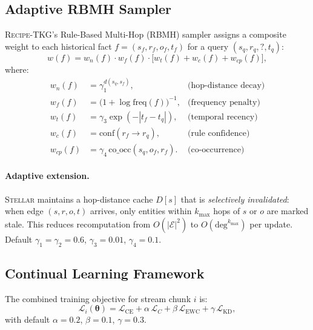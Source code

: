 \documentclass[10pt,twocolumn]{article}
\theoremstyle{definition}
\newcommand{\recipe}{\textsc{Recipe-TKG}}
\newcommand{\bftheta}{\bm{\theta}}
\newcommand{\calE}{\mathcal{E}}
\newcommand{\calL}{\mathcal{L}}
\begin{document}
\subsection{Adaptive RBMH Sampler}
\label{sec:sampler}

\recipe{}'s Rule-Based Multi-Hop (RBMH) sampler assigns a composite weight
to each historical fact $f = (s_f, r_f, o_f, t_f)$ for a query
$(s_q, r_q, ?, t_q)$:
\begin{equation}
  w(f) = w_n(f)\cdot w_f(f)\cdot\bigl[w_t(f) + w_c(f) + w_{cp}(f)\bigr],
  \label{eq:rbmh}
\end{equation}
where:
\begin{align}
  w_n(f) &= \gamma_1^{d(s_q, s_f)},
             &\text{(hop-distance decay)}\\
  w_f(f) &= \bigl(1 + \log \text{freq}(f)\bigr)^{-1},
             &\text{(frequency penalty)}\\
  w_t(f) &= \gamma_3 \exp(-|t_f - t_q|),
             &\text{(temporal recency)}\\
  w_c(f) &= \text{conf}(r_f \to r_q),
             &\text{(rule confidence)}\\
  w_{cp}(f) &= \gamma_4\, \text{co\_occ}(s_q, o_f, r_f).
              &\text{(co-occurrence)}
\end{align}
\paragraph{Adaptive extension.}
\textsc{Stellar} maintains a hop-distance cache $D[s]$ that is \emph{selectively
invalidated}: when edge $(s, r, o, t)$ arrives, only entities within
$k_{\max}$ hops of $s$ or $o$ are marked stale.
This reduces recomputation from $O(|\calE|^2)$ to $O(\text{deg}^{k_{\max}})$
per update.
Default $\gamma_1 = \gamma_2 = 0.6$,
$\gamma_3 = 0.01$, $\gamma_4 = 0.1$.

\subsection{Continual Learning Framework}
\label{sec:cl}

The combined training objective for stream chunk $i$ is:
\begin{equation}
  \calL_i(\bftheta)
  = \calL_{\text{CE}}
    + \alpha\,\calL_C
    + \beta\,\calL_{\text{EWC}}
    + \gamma\,\calL_{\text{KD}},
  \label{eq:total_loss}
\end{equation}
with default $\alpha = 0.2$, $\beta = 0.1$, $\gamma = 0.3$.
\end{document}
